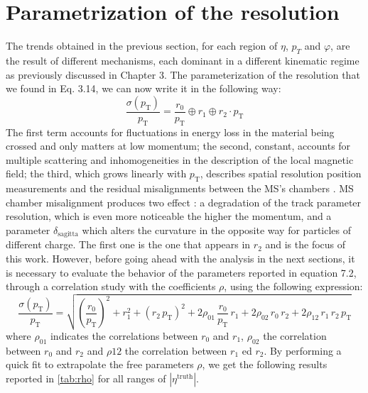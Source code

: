\documentclass[11pt,a4paper,twoside,openright]{report}
\begin{document}
\section{Parametrization of the resolution}
\label{sec:parametrizzazione}

The trends obtained in the previous section, for each region of $\eta$, $p_{T}$ and $\varphi$, are the result of different mechanisms, each dominant in a different kinematic regime as previously discussed in Chapter 3. The parameterization of the resolution that we found in Eq. 3.14, we can now write it in the following way:
\begin{equation}
    \frac{\sigma(p_\mathrm{T})}{p_\mathrm{T}}= \frac{r_0}{p_\mathrm{T}} \oplus r_1 \oplus r_2\cdot p_\mathrm{T}
    \label{eq:parametrizzazione}
\end{equation}
The first term accounts for fluctuations in energy loss in the material being crossed and only matters at low momentum; the second, constant, accounts for multiple scattering and inhomogeneities in the description of the local magnetic field; the third, which
grows linearly with $p_{\mathrm{T}}$, describes spatial resolution
position measurements and the residual misalignments between the MS's chambers \cite{ATLAS-MCP-2023}. MS chamber misalignment produces two effect \cite{ATLAS-ID-ALIGN-2020}: a degradation of the track parameter resolution, which is even more noticeable the higher the momentum, and a parameter $\delta_{\mathrm{sagitta}}$ which alters the curvature in the opposite way for particles of different charge. The first one is the one that appears in $r_2$ and is the focus of this work. However, before going ahead with the analysis in the next sections, it is necessary to evaluate the behavior of the parameters reported in equation 7.2, through a correlation study with the coefficients $\rho$, using the following expression:
\begin{equation}
  \frac{\sigma(p_\mathrm{T})}{p_\mathrm{T}} = \sqrt{\left(\frac{r_0}{p_\mathrm{T}}\right)^2 + r_1^2 + \left(r_2\, p_\mathrm{T}\right)^2 + 2\rho_{01}\,\frac{r_0}{p_\mathrm{T}}\,r_1 + 2\rho_{02}\,r_0\, r_2 + 2\rho_{12}\, r_1\, r_2\, p_\mathrm{T}}
  \label{eq:fit_correlato}
\end{equation}
where $\rho_{01}$ indicates the correlations between $r_0$ and $r_1$, $\rho_{02}$ the correlation between $r_0$ and $r_2$ and $\rho{12}$ the correlation between $r_1$ ed $r_2$. By performing a quick fit to extrapolate the free parameters $\rho$, we get the following results reported in \cref{tab:rho} for all ranges of $|\eta^\mathrm{truth}|$. 
\end{document}
